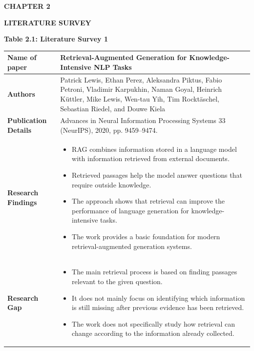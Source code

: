 \documentclass[12pt,a4paper]{report}
\newcommand{\chaptertitle}[2]{
    \begin{center}
        {\fontsize{18}{21}\selectfont\bfseries CHAPTER #1\par}
        \vspace{0.10in}
        {\fontsize{18}{21}\selectfont\bfseries #2\par}
    \end{center}
    \vspace{0.12in}
}
\begin{document}

\chaptertitle{2}{LITERATURE SURVEY}
\label{ch:2}
\small

\begin{center}\textbf{Table 2.1: Literature Survey 1}\end{center}\label{tab:lit1}
\begin{longtable}{|p{1.25in}|p{5.15in}|}
\hline
\textbf{Name of paper} & Retrieval-Augmented Generation for Knowledge-Intensive NLP Tasks \cite{lewis2020rag} \\ \hline

\textbf{Authors} & Patrick Lewis, Ethan Perez, Aleksandra Piktus, Fabio Petroni, Vladimir Karpukhin, Naman Goyal, Heinrich K\"uttler, Mike Lewis, Wen-tau Yih, Tim Rockt\"aschel, Sebastian Riedel, and Douwe Kiela \\ \hline

\textbf{Publication Details} & Advances in Neural Information Processing Systems 33 (NeurIPS), 2020, pp. 9459--9474. \\ \hline

\textbf{Research Findings} &
\begin{itemize}[leftmargin=0.18in,itemsep=0.05in,topsep=0pt,parsep=0pt]
\item RAG combines information stored in a language model with information retrieved from external documents.
\item Retrieved passages help the model answer questions that require outside knowledge.
\item The approach shows that retrieval can improve the performance of language generation for knowledge-intensive tasks.
\item The work provides a basic foundation for modern retrieval-augmented generation systems.
\end{itemize} \\ \hline

\textbf{Research Gap} &
\begin{itemize}[leftmargin=0.18in,itemsep=0.05in,topsep=0pt,parsep=0pt]
\item The main retrieval process is based on finding passages relevant to the given question.
\item It does not mainly focus on identifying which information is still missing after previous evidence has been retrieved.
\item The work does not specifically study how retrieval can change according to the information already collected.
\end{itemize} \\ \hline


\end{longtable}
\end{document}
